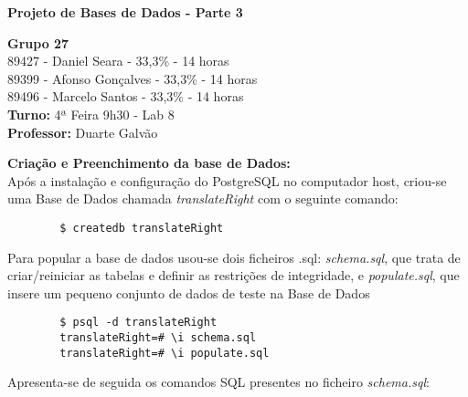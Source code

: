 \documentclass[12pt]{report}
\begin{document}
    \begin{titlepage}
        \begin{center}

            \vspace*{\fill}
            \Huge
            \textbf{Projeto de Bases de Dados - Parte 3}
            
            \vspace*{\fill}

            \Large
            \textbf{Grupo 27} \\
            89427 - Daniel Seara - 33,3\% - 14 horas \\
            89399 - Afonso Gonçalves - 33,3\% - 14 horas \\
            89496 - Marcelo Santos - 33,3\% - 14 horas \\

            \bigskip
            \textbf{Turno:} 4ª Feira 9h30 - Lab 8\\ \textbf{Professor:} Duarte Galvão
        
        \end{center}
    \end{titlepage}

    \Large
    \textbf{Criação e Preenchimento da base de Dados:}\\
    
    \normalsize
    \vspace{2mm}
    Após a instalação e configuração do PostgreSQL no computador host, criou-se uma Base de Dados chamada \textit{translateRight} com o seguinte comando:
    \begin{verbatim}
        $ createdb translateRight
    \end{verbatim}
    
    Para popular a base de dados usou-se dois ficheiros .sql: \textit{schema.sql}, que trata de criar/reiniciar as tabelas e definir as restrições de integridade, e \textit{populate.sql}, que insere um pequeno conjunto de dados de teste na Base de Dados
    \begin{verbatim}
        $ psql -d translateRight
        translateRight=# \i schema.sql
        translateRight=# \i populate.sql
    \end{verbatim}


    \vspace{2mm}
    Apresenta-se de seguida os comandos SQL presentes no ficheiro \textit{schema.sql}:
\end{document}
